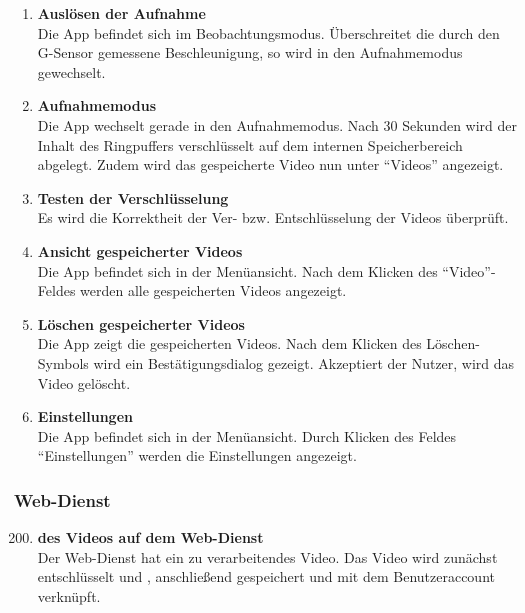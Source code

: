 \begin{enumerate}[\bfseries{TK}10]
\item \textbf{Ausl\"osen der Aufnahme} \hfill\\  
Die \gls{App} befindet sich im Beobachtungsmodus. Überschreitet die durch den \gls{G-Sensor} gemessene Beschleunigung, so wird in den Aufnahmemodus gewechselt.

\item \textbf{Aufnahmemodus} \hfill\\  
Die \gls{App} wechselt gerade in den Aufnahmemodus. Nach 30 Sekunden wird der Inhalt des Ringpuffers verschl\"usselt auf dem internen Speicherbereich abgelegt. Zudem wird das gespeicherte Video nun unter ``Videos'' angezeigt. 

\item \textbf{Testen der Verschl\"usselung} \hfill\\
Es wird die Korrektheit der Ver- bzw. Entschlüsselung der Videos überprüft.

\item \textbf{Ansicht gespeicherter Videos} \hfill\\
Die \gls{App} befindet sich in der Men\"uansicht. Nach dem Klicken des ``Video''-Feldes werden alle gespeicherten Videos angezeigt.

\item \textbf{Löschen gespeicherter Videos} \hfill\\
Die \gls{App} zeigt die gespeicherten Videos. Nach dem Klicken des Löschen-Symbols wird ein Bestätigungsdialog gezeigt. Akzeptiert der Nutzer, wird das Video gelöscht.

\item \textbf{Einstellungen} \hfill\\
Die \gls{App} befindet sich in der Men\"uansicht. Durch Klicken des Feldes ``Einstellungen'' werden die Einstellungen angezeigt.

\end{enumerate}

\subsubsection{\gls{Web-Dienst}}
\begin{enumerate}[\bfseries{TK}10]  
\setcounter{enumi}{199}{}
\item \textbf{ des Videos auf dem \gls{Web-Dienst}} \hfill\\  
Der Web-Dienst hat ein zu verarbeitendes Video. Das Video wird zunächst entschlüsselt und  , anschließend gespeichert und mit dem Benutzeraccount verkn\"upft.

\end{enumerate}

